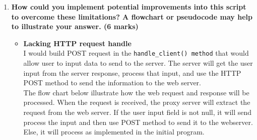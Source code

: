 \documentclass[11pt]{article}
\begin{document}
\begin{enumerate}
		\item \textbf{How could you implement potential improvements into this script to overcome these limitations? A flowchart or pseudocode may help to illustrate your answer. (6 marks)}\\
			\begin{itemize}
				\item \textbf{Lacking HTTP request handle} \\
					I would build POST request in the \texttt{handle\_client() method} that would allow user to input data to send to the server. The server will get the user input from the server response, process that input, and use the HTTP POST method to send the information to the web server. \\
					The flow chart below illustrate how the web request and response will be processed. When the request is received, the proxy server will extract the request from the web server. If the user input field is not null, it will send process the input and then use POST method to send it to the webserver. Else, it will process as implemented in the initial program. \\
					\begin{center}

\end{center}
\end{itemize}
\end{enumerate}
\end{document}
